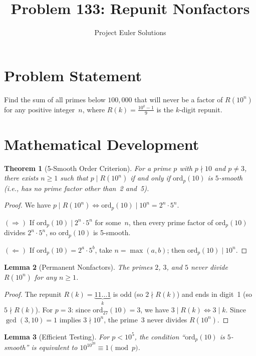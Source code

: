 \documentclass[12pt]{article}
\title{Problem 133: Repunit Nonfactors}
\author{Project Euler Solutions}
\date{}
\newtheorem{theorem}{Theorem}
\newtheorem{lemma}[theorem]{Lemma}
\begin{document}
\maketitle

\section{Problem Statement}
Find the sum of all primes below $100{,}000$ that will never be a factor of $R(10^n)$ for any positive integer~$n$, where $R(k) = \frac{10^k - 1}{9}$ is the $k$-digit repunit.

\section{Mathematical Development}

\begin{theorem}[5-Smooth Order Criterion]
For a prime $p$ with $p \nmid 10$ and $p \neq 3$, there exists $n \geq 1$ such that $p \mid R(10^n)$ if and only if $\mathrm{ord}_p(10)$ is $5$-smooth (i.e., has no prime factor other than~2 and~5).
\end{theorem}

\begin{proof}
We have $p \mid R(10^n) \iff \mathrm{ord}_p(10) \mid 10^n = 2^n \cdot 5^n$.

$(\Rightarrow)$ If $\mathrm{ord}_p(10) \mid 2^n \cdot 5^n$ for some~$n$, then every prime factor of $\mathrm{ord}_p(10)$ divides $2^n \cdot 5^n$, so $\mathrm{ord}_p(10)$ is 5-smooth.

$(\Leftarrow)$ If $\mathrm{ord}_p(10) = 2^a \cdot 5^b$, take $n = \max(a, b)$; then $\mathrm{ord}_p(10) \mid 10^n$.
\end{proof}

\begin{lemma}[Permanent Nonfactors]
The primes $2$, $3$, and $5$ never divide $R(10^n)$ for any $n \geq 1$.
\end{lemma}

\begin{proof}
The repunit $R(k) = \underbrace{11\ldots 1}_k$ is odd (so $2 \nmid R(k)$) and ends in digit~1 (so $5 \nmid R(k)$). For $p = 3$: since $\mathrm{ord}_{27}(10) = 3$, we have $3 \mid R(k) \iff 3 \mid k$. Since $\gcd(3, 10) = 1$ implies $3 \nmid 10^n$, the prime~3 never divides $R(10^n)$.
\end{proof}

\begin{lemma}[Efficient Testing]
For $p < 10^5$, the condition ``$\mathrm{ord}_p(10)$ is $5$-smooth'' is equivalent to $10^{10^{20}} \equiv 1 \pmod{p}$.
\end{lemma}
\end{document}
